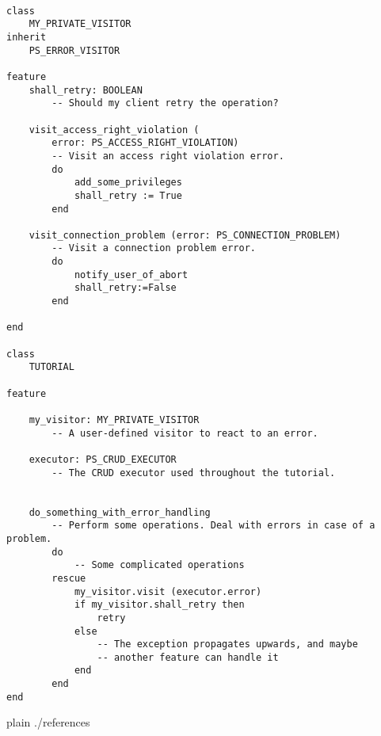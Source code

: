 \documentclass[a4paper,12pt]{report}
\begin{document}
\begin{lstlisting}[language=OOSC2Eiffel, captionpos=b, caption={Sample error handling using a visitor.}, label={lst:error_visitor_example}]

class
	MY_PRIVATE_VISITOR
inherit
	PS_ERROR_VISITOR

feature
	shall_retry: BOOLEAN
		-- Should my client retry the operation?

	visit_access_right_violation (
		error: PS_ACCESS_RIGHT_VIOLATION)
		-- Visit an access right violation error.
		do
			add_some_privileges
			shall_retry := True
		end

	visit_connection_problem (error: PS_CONNECTION_PROBLEM)
		-- Visit a connection problem error.
		do
			notify_user_of_abort
			shall_retry:=False
		end

end

class
	TUTORIAL

feature

	my_visitor: MY_PRIVATE_VISITOR
		-- A user-defined visitor to react to an error.

	executor: PS_CRUD_EXECUTOR
		-- The CRUD executor used throughout the tutorial.


	do_something_with_error_handling
		-- Perform some operations. Deal with errors in case of a problem.
		do
			-- Some complicated operations
		rescue
			my_visitor.visit (executor.error)
			if my_visitor.shall_retry then
				retry
			else
				-- The exception propagates upwards, and maybe
				-- another feature can handle it
			end
		end
end

\end{lstlisting}


%

%

\begin{flushleft}
 
{{{
 {plain}
 {./references}
}}}
\end{flushleft}
\end{document}

